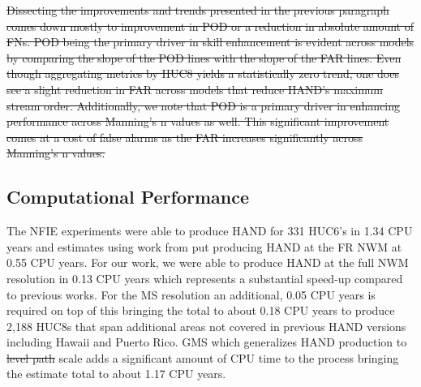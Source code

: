 \documentclass[draft]{dependencies/agujournal2019}
\providecommand{\DIFadd}[1]{{\protect\color{blue}\uwave{#1}}} %
\providecommand{\DIFdel}[1]{{\protect\color{red}\sout{#1}}}                      %
\providecommand{\DIFaddbegin}{} %
\providecommand{\DIFaddend}{} %
\providecommand{\DIFdelbegin}{} %
\providecommand{\DIFdelend}{} %
\begin{document}
\DIFdel{Dissecting the improvements and trends presented in the previous paragraph comes down mostly to improvement in POD or a reduction in absolute amount of FNs.
POD being the primary driver in skill enhancement is evident across models by comparing the slope of the POD lines with the slope of the FAR lines.
Even though aggregating metrics by HUC8 yields a statistically zero trend, one does see a slight reduction in FAR across models that reduce HAND's maximum stream order.
Additionally, we note that POD is a primary driver in enhancing performance across Manning's n values as well.
This significant improvement comes at a cost of false alarms as the FAR increases significantly across Manning's n values.
}\DIFdelend %
\subsection{Computational Performance}
\label{ssec:compuational_performance}
%
The NFIE experiments were able to produce HAND for 331 HUC6's in 1.34 CPU years \cite{liu2016cybergis} and estimates using work from  put producing HAND at the FR NWM at 0.55 CPU years. 
For our work, we were able to produce HAND at the full NWM resolution in 0.13 CPU years which represents a substantial speed-up compared to previous works.
For the MS resolution an additional, 0.05 CPU years is required on top of this bringing the total to about 0.18 CPU years to produce 2,188 HUC8s that span additional areas not covered in previous HAND versions including Hawaii and Puerto Rico.
GMS which generalizes HAND production to \DIFdelbegin \DIFdel{level path }\DIFdelend \DIFaddbegin \DIFadd{the LP }\DIFaddend scale adds a significant amount of CPU time to the process bringing the estimate total to about 1.17 CPU years.
%
\clearpage %
\end{document}
